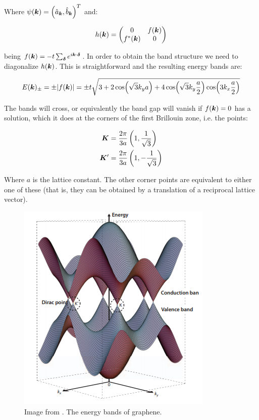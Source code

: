 Where $\psi(\boldsymbol{k}) = \left( \hat{a}_{\boldsymbol{k}}, \hat{b}_{\boldsymbol{k}} \right)^T$ and:

\begin{equation}
h(\boldsymbol{k}) = \begin{pmatrix}
    0 & f(\boldsymbol{k}) \\
    f^*(\boldsymbol{k}) & 0
\end{pmatrix}
\end{equation}

being $f(\boldsymbol{k}) = -t\sum_{\boldsymbol{\delta}} e^{i\boldsymbol{k}\cdot\boldsymbol{\delta}}$. In order to obtain the band structure we need to diagonalize $h(\boldsymbol{k})$. This is straightforward and the resulting energy bands are:

\begin{equation}
E(\boldsymbol{k})_{\pm} = \pm|f(\boldsymbol{k})| = \pm t\sqrt{3+2\cos(\sqrt{3}k_ya) +4\cos(\sqrt{3}k_y\frac{a}{2})\cos(3k_x\frac{a}{2})}
\end{equation}

The bands will cross, or equivalently the band gap will vanish if $f(\boldsymbol{k})=0$ has a solution, which it does at the corners of the first Brillouin zone, i.e. the points:

\begin{align*}
\boldsymbol{K} &= \frac{2\pi}{3a}\left( 1, \frac{1}{\sqrt{3}}\right) \\
\boldsymbol{K}' &= \frac{2\pi}{3a}\left( 1, -\frac{1}{\sqrt{3}}\right) 
\end{align*}

Where $a$ is the lattice constant. The other corner points are equivalent to either one of these (that is, they can be obtained by a translation of a reciprocal lattice vector).

\begin{figure}
\centering
  \includegraphics[width=0.7\linewidth]{../Figures/graphene_bands.png}
  \caption{Image from \cite{Ando2009}. The energy bands of graphene.} 
\label{FigD1}
\end{figure}


